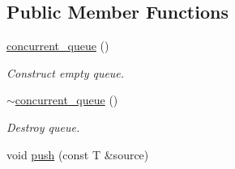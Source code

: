 \subsection*{Public Member Functions}
\begin{DoxyCompactItemize}
\item 
\hypertarget{classtbb_1_1concurrent__queue_a970615986fb44ad820d77752e5ff6277}{}\hyperlink{classtbb_1_1concurrent__queue_a970615986fb44ad820d77752e5ff6277}{concurrent\+\_\+queue} ()\label{classtbb_1_1concurrent__queue_a970615986fb44ad820d77752e5ff6277}

\begin{DoxyCompactList}\small\item\em Construct empty queue. \end{DoxyCompactList}\item 
\hypertarget{classtbb_1_1concurrent__queue_ad42649cd383dba2b259a216ccca07100}{}\hyperlink{classtbb_1_1concurrent__queue_ad42649cd383dba2b259a216ccca07100}{$\sim$concurrent\+\_\+queue} ()\label{classtbb_1_1concurrent__queue_ad42649cd383dba2b259a216ccca07100}

\begin{DoxyCompactList}\small\item\em Destroy queue. \end{DoxyCompactList}\item 
\hypertarget{classtbb_1_1concurrent__queue_ac59b2f0ad661451162c594b535389f34}{}void \hyperlink{classtbb_1_1concurrent__queue_ac59b2f0ad661451162c594b535389f34}{push} (const T \&source)\label{classtbb_1_1concurrent__queue_ac59b2f0ad661451162c594b535389f34}


\end{DoxyCompactItemize}
